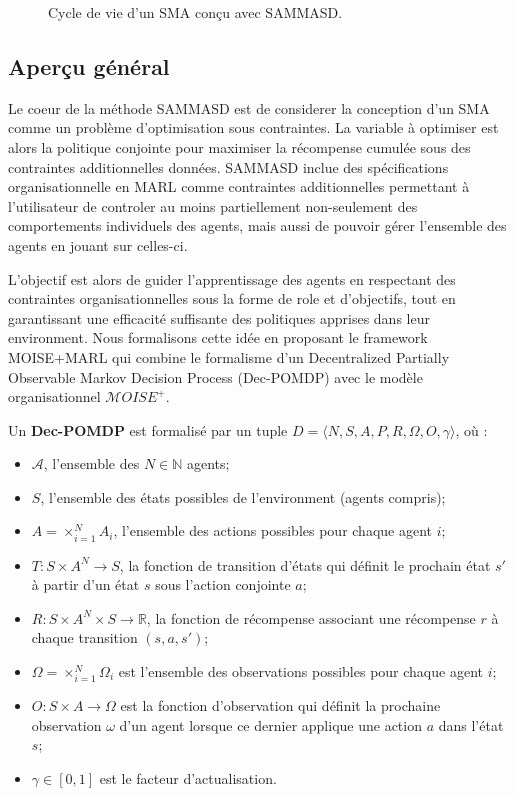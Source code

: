\documentclass[sigconf,anonymous]{aamas}
\begin{document}
\begin{figure*}[h!]
    \centering
    
    \caption{Cycle de vie d'un SMA conçu avec SAMMASD.}
    \label{fig:cycle}
  \end{figure*}

\subsection{Aperçu général}

Le coeur de la méthode SAMMASD est de considerer la conception d'un SMA comme un problème d'optimisation sous contraintes. La variable à optimiser est alors la politique conjointe pour maximiser la récompense cumulée sous des contraintes additionnelles données. SAMMASD inclue des spécifications organisationnelle en MARL comme contraintes additionnelles permettant à l'utilisateur de controler au moins partiellement non-seulement des comportements individuels des agents, mais aussi de pouvoir gérer l'ensemble des agents en jouant sur celles-ci.

L'objectif est alors de guider l'apprentissage des agents en respectant des contraintes organisationnelles sous la forme de role et d'objectifs, tout en garantissant une efficacité suffisante des politiques apprises dans leur environment.
Nous formalisons cette idée en proposant le framework MOISE+MARL qui combine le formalisme d'un Decentralized Partially Observable Markov Decision Process (Dec-POMDP) avec le modèle organisationnel $\mathcal{M}OISE^+$.

Un \textbf{Dec-POMDP} est formalisé par un tuple $D = \langle N, S, A, P, R, \Omega, O, \gamma \rangle$, où :
\begin{itemize}
    \item $\mathcal{A}$, l'ensemble des $N \in \mathbb{N}$ agents;
    \item $S$, l'ensemble des états possibles de l'environment (agents compris);
    \item $A = \times_{i=1}^N A_i $, l'ensemble des actions possibles pour chaque agent $i$;
    \item $T: S \times A^N \to S$, la fonction de transition d'états qui définit le prochain état $s'$ à partir d'un état $s$ sous l'action conjointe $a$;
    \item $R: S \times A^N \times  S \to \mathbb{R}$, la fonction de récompense associant une récompense $r$ à chaque transition $(s, a, s')$;
    \item $\Omega = \times_{i=1}^N \Omega_i $ est l'ensemble des observations possibles pour chaque agent $i$;
    \item $O: S \times A \to \Omega$ est la fonction d'observation qui définit la prochaine observation $\omega$ d'un agent lorsque ce dernier applique une action $a$ dans l'état $s$;
    \item $\gamma \in [0, 1] $ est le facteur d'actualisation.
\end{itemize}
\end{document}
